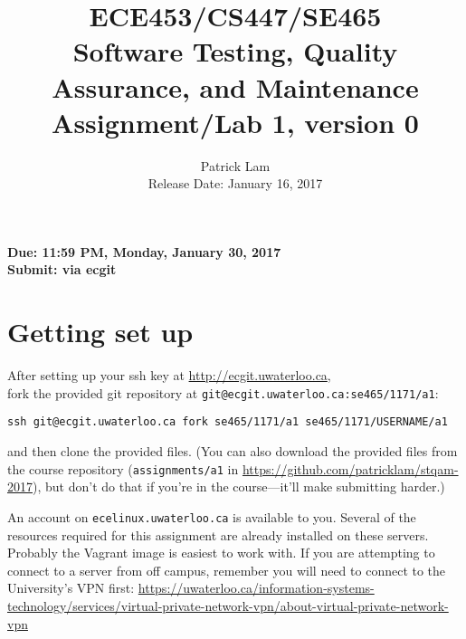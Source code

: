 \documentclass[10pt,hidelinks]{article}
\begin{document}
\title{
ECE453/CS447/SE465 \\
Software Testing, Quality Assurance, and Maintenance\\
Assignment/Lab 1, version 0}
\author{Patrick Lam \\
{Release Date:  January 16, 2017} \\
}
\renewcommand{\today}{}
\maketitle

\begin{center}

{\bf Due:  11:59 PM, Monday, January 30, 2017} \\
{\bf Submit: via ecgit }\\
\end{center}



\section*{Getting set up}
After setting up your ssh key at \url{http://ecgit.uwaterloo.ca}, \\ fork the provided git repository at {\tt git@ecgit.uwaterloo.ca:se465/1171/a1}:

\begin{center}
{\tt ssh git@ecgit.uwaterloo.ca fork se465/1171/a1 se465/1171/USERNAME/a1}
\end{center}

\noindent and then clone the provided files. 
(You can also download the provided
files from the course repository ({\tt assignments/a1} in \url{https://github.com/patricklam/stqam-2017}),
but don't do that if you're in the course---it'll make submitting harder.)

An account on {\tt ecelinux.uwaterloo.ca} is available to you.
Several of the resources required for this assignment are already installed on these servers. Probably the Vagrant image is easiest to work with.
If you are attempting to connect to a server from off campus, remember you will need to connect to the University's VPN first: \url{https://uwaterloo.ca/information-systems-technology/services/virtual-private-network-vpn/about-virtual-private-network-vpn}
\end{document}
